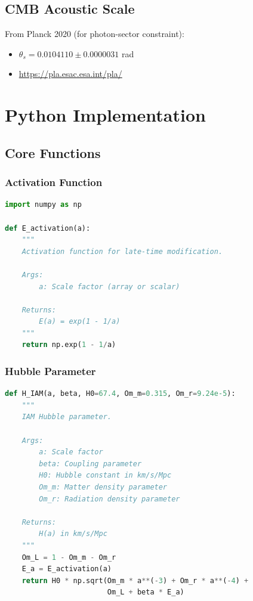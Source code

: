 \documentclass[11pt]{article}
\begin{document}
\subsection{CMB Acoustic Scale}

From Planck 2020 (for photon-sector constraint):
\begin{itemize}
    \item $\theta_s = 0.0104110 \pm 0.0000031$ rad
    \item \url{https://pla.esac.esa.int/pla/}
\end{itemize}

\section{Python Implementation}

\subsection{Core Functions}

\subsubsection{Activation Function}

\begin{lstlisting}[language=Python]
import numpy as np

def E_activation(a):
    """
    Activation function for late-time modification.
    
    Args:
        a: Scale factor (array or scalar)
    
    Returns:
        E(a) = exp(1 - 1/a)
    """
    return np.exp(1 - 1/a)
\end{lstlisting}

\subsubsection{Hubble Parameter}

\begin{lstlisting}[language=Python]
def H_IAM(a, beta, H0=67.4, Om_m=0.315, Om_r=9.24e-5):
    """
    IAM Hubble parameter.
    
    Args:
        a: Scale factor
        beta: Coupling parameter
        H0: Hubble constant in km/s/Mpc
        Om_m: Matter density parameter
        Om_r: Radiation density parameter
    
    Returns:
        H(a) in km/s/Mpc
    """
    Om_L = 1 - Om_m - Om_r
    E_a = E_activation(a)
    return H0 * np.sqrt(Om_m * a**(-3) + Om_r * a**(-4) + 
                        Om_L + beta * E_a)
\end{lstlisting}
\end{document}
